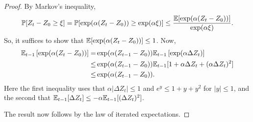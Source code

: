 \begin{proof}%
By Markov's inequality,
\[ \mathbb{P}[Z_t - Z_0 \geq \xi ]  = \mathbb{P}[\exp(\alpha (Z_t-Z_0)) \geq \exp(\alpha \xi)] \leq \frac{\mathbb{E}[\exp(\alpha (Z_t-Z_0))] }{\exp(\alpha \xi)}.\]
So, it suffices to show that $\mathbb{E}[ \exp(\alpha (Z_t-Z_0)) ]  \leq 1$. 
Now,
\begin{align*}
\E_{t-1}\left[\exp(\alpha (Z_t-Z_0))\right] = &  %
  \exp(\alpha (Z_{t-1}-Z_0))\E_{t-1}\left[\exp(\alpha \Delta Z_t)\right] \\
 \le &  \exp(\alpha (Z_{t-1}-Z_0)) \E_{t-1}[1+\alpha \Delta Z_t + (\alpha \Delta Z_t)^2] \\
  \leq & \exp(\alpha (Z_{t-1}-Z_0)). \qquad 
\end{align*}
Here the first inequality uses that $\alpha |\Delta Z_t|\leq 1$ and $e^y \leq 1 + y + y^2$ for $ |y| \leq 1$, and the second that 
 $\mathbb{E}_{t-1}[\Delta Z_t] \leq -\alpha \mathbb{E}_{t-1}[(\Delta Z_t)^2]$.

The result now follows by the law of iterated expectations.
\end{proof}


